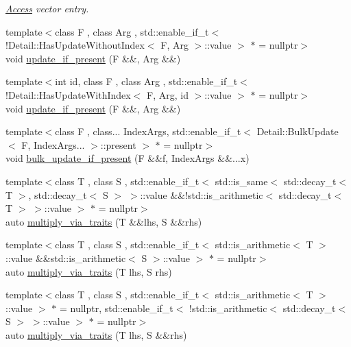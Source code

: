 \begin{DoxyCompactItemize}
\begin{DoxyCompactList}\small\item\em \hyperlink{namespaceFunG_1_1Access}{Access} vector entry. \end{DoxyCompactList}\item 
{\footnotesize template$<$class F , class Arg , std\+::enable\+\_\+if\+\_\+t$<$ !\+Detail\+::\+Has\+Update\+Without\+Index$<$ F, Arg $>$\+::value $>$ $\ast$  = nullptr$>$ }\\void \hyperlink{namespaceFunG_a3b9d2e5d07b30c2ee26703b33e9adb9e}{update\+\_\+if\+\_\+present} (F \&\&, Arg \&\&)
\item 
{\footnotesize template$<$int id, class F , class Arg , std\+::enable\+\_\+if\+\_\+t$<$ !\+Detail\+::\+Has\+Update\+With\+Index$<$ F, Arg, id $>$\+::value $>$ $\ast$  = nullptr$>$ }\\void \hyperlink{namespaceFunG_aed5ddbef97c98202e818bca2b74c75d2}{update\+\_\+if\+\_\+present} (F \&\&, Arg \&\&)
\item 
{\footnotesize template$<$class F , class... Index\+Args, std\+::enable\+\_\+if\+\_\+t$<$ Detail\+::\+Bulk\+Update$<$ F, Index\+Args... $>$\+::present $>$ $\ast$  = nullptr$>$ }\\void \hyperlink{namespaceFunG_a3a871f854db9e381d7a09724924971dc}{bulk\+\_\+update\+\_\+if\+\_\+present} (F \&\&f, Index\+Args \&\&...x)
\item 
{\footnotesize template$<$class T , class S , std\+::enable\+\_\+if\+\_\+t$<$ std\+::is\+\_\+same$<$ std\+::decay\+\_\+t$<$ T $>$, std\+::decay\+\_\+t$<$ S $>$ $>$\+::value \&\&!std\+::is\+\_\+arithmetic$<$ std\+::decay\+\_\+t$<$ T $>$ $>$\+::value $>$ $\ast$  = nullptr$>$ }\\auto \hyperlink{namespaceFunG_a839a72c59a888ed89d3efe38897cc376}{multiply\+\_\+via\+\_\+traits} (T \&\&lhs, S \&\&rhs)
\item 
{\footnotesize template$<$class T , class S , std\+::enable\+\_\+if\+\_\+t$<$ std\+::is\+\_\+arithmetic$<$ T $>$\+::value \&\&std\+::is\+\_\+arithmetic$<$ S $>$\+::value $>$ $\ast$  = nullptr$>$ }\\auto \hyperlink{namespaceFunG_a95f9f46143d0a53a378f776e300c3520}{multiply\+\_\+via\+\_\+traits} (T lhs, S rhs)
\item 
{\footnotesize template$<$class T , class S , std\+::enable\+\_\+if\+\_\+t$<$ std\+::is\+\_\+arithmetic$<$ T $>$\+::value $>$ $\ast$  = nullptr, std\+::enable\+\_\+if\+\_\+t$<$ !std\+::is\+\_\+arithmetic$<$ std\+::decay\+\_\+t$<$ S $>$ $>$\+::value $>$ $\ast$  = nullptr$>$ }\\auto \hyperlink{namespaceFunG_a780ef12ebddaa8e729d8629d24ae76c5}{multiply\+\_\+via\+\_\+traits} (T lhs, S \&\&rhs)

\end{DoxyCompactItemize}

